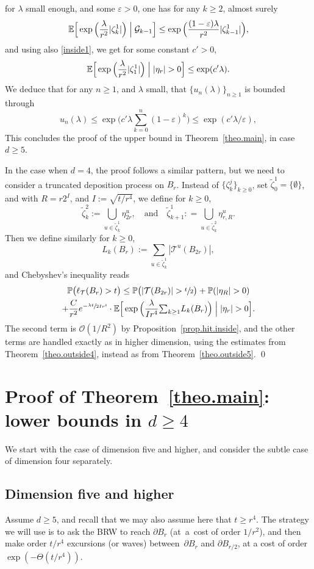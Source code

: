 \documentclass[JEP,XML,SOM,Unicode,NoFloatCountersInSection,published]{cedram}
\let\ts\textstyle
\theoremstyle{plain}
\theoremstyle{definition}
\newcommand{\1}{{\text{\Large $\mathfrak 1$}}}
\begin{document}
for $\lambda$ small enough, and some $\varepsilon>0$, one has for any $k\ge 2$, almost surely
\[
\mathbb E\Big[\exp\Big(\frac{\lambda}{r^2}|\zeta_k^1| \Big)\Bigm|\mathcal G_{k-1} \Big] \le \exp\Big(\frac{(1-\varepsilon)\lambda}{r^2} |\zeta_{k-1}^1|\Big),
\]
and using also \eqref{inside1}, we get for some constant $c'>0$,
\[
\mathbb E\Big[\exp\Big(\frac{\lambda}{r^2}|\zeta_1^1| \Big)\Bigm| |\eta_r|> 0 \Big] \le \exp(c'\lambda).
\]
We deduce that for any $n\ge 1$, and $\lambda$ small,
that $\{u_n(\lambda)\}_{n\ge 1}$ is bounded through
\[
u_n(\lambda) \le \exp\big(c'\lambda\ts
\sum_{k=0}^n (1-\varepsilon)^k)\le \exp(c'\lambda/\varepsilon),
\]
This concludes the proof of the upper bound in Theorem~\ref{theo.main},
in case $d\ge 5$.

In the case when $d=4$, the proof follows a similar pattern, but we
need to consider a truncated deposition process on $B_r$.
Instead of $\{\zeta_k^j\}_{k\ge 0}$,
set $\tilde \zeta_0^1 = \{\emptyset\}$, and
with $R = r2^I$, and $I:=\sqrt{t/r^4}$, we define for $k\ge 0$,
\[
\tilde \zeta_k^2:= \bigcup_{u\in \tilde \zeta_k^1} \eta^u_{2r},
\quad \text{and}\quad
\tilde \zeta_{k+1}^1: = \bigcup_{u\in \tilde \zeta_k^2}
\eta^u_{r,R}.
\]
Then we define similarly for $k\ge 0$,
\[
L_k(B_r) := \sum_{u\in \tilde \zeta_k^1} |\mathcal T^u(B_{2r})|,
\]
and Chebyshev's inequality reads
\begin{multline*}%
\mathbb P\big(\ell_{\mathcal T}(B_r)>t\big) \le
\mathbb P\big(|\mathcal T(B_{2r})|>\sfrac t2\big) +
\mathbb P(|\eta_R|>0) \\
+ \frac{C}{r^2}e^{-\sfrac{\lambda t}{2Ir^4}} \cdot
\mathbb E\Big[\exp\Big(\frac{\lambda}{Ir^4}{\ts\sum_{k\ge 1}} L_k(B_r)\Big)\Bigm| |\eta_r|> 0 \Big].
\end{multline*}
The second term is $\mathcal O(1/R^2)$ by Proposition~\ref{prop.hit.inside}, and the other terms are handled exactly as in higher dimension, using the estimates from Theorem~\ref{theo.outside4}, instead as from Theorem~\ref{theo.outside5}. \qed

\section{Proof of Theorem~\ref{theo.main}: lower bounds in \texorpdfstring{$d\ge 4$}{d4}}
\label{sec-LB4}

We start with the case of dimension five and higher,
and consider the subtle case of dimension four separately.

\subsection{Dimension five and higher}
Assume $d\ge 5$, and recall that we may also assume here that $t\ge r^4$.
The strategy we will use is to ask the BRW to reach $\partial B_r$ (at~a~cost of order $1/r^2$),
and then make order $t/r^4$ excursions (or waves) between~$\partial B_r$ and $\partial B_{r/2}$, at a cost of order $\exp(-\Theta(t/r^4))$.
\end{document}
